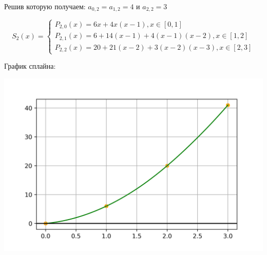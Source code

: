 \documentclass[a4paper,12pt]{report} %
\begin{document}
Решив которую получаем: $a_{0, 2} = a_{1, 2} = 4$ и $a_{2, 2} = 3$

\[
	S_2(x) = 
	\left\{
		\begin{aligned}
		P_{2, 0}(x) = 6x + 4x(x - 1), x \in [0, 1]\\
		P_{2, 1}(x) = 6 + 14(x - 1) + 4(x - 1)(x - 2), x \in [1, 2] \\
		P_{2, 2}(x) = 20 + 21(x - 2) + 3(x - 2)(x - 3), x \in [2, 3]
		\end{aligned}
	\right.
\]

График сплайна:

\includegraphics{regular_calc_17.png}
\end{document}
